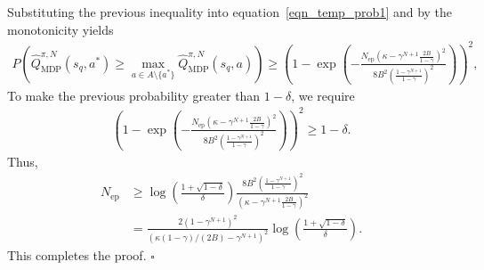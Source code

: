 \documentclass[10pt]{article}
\def\eqref#1{equation~\ref{#1}}
\newenvironment{myproof}{{\noindent\it Proof. }}{\hfill $\square$ \par}
\begin{document}
\begin{myproof}
Substituting the previous inequality into \eqref{eqn_temp_prob1} and by the monotonicity yields
\begin{align}
    P \left( \hat{Q}_\text{MDP}^{\pi, N}(s_q, a^*) \geq \max_{a \in A \setminus \{a^*\}} \hat{Q}_\text{MDP}^{\pi, N}(s_q, a) \right)
    \geq \left( 1 - \exp \left( - \frac{N_\text{ep}  \left(\kappa - \gamma^{N+1} \frac{2B}{1-\gamma} \right)^2}{8B^2 \left( \frac{1-\gamma^{N+1}}{1-\gamma}\right)^2} \right) \right)^2,
\end{align}
To make the previous probability greater than $1-\delta$, we require
\begin{align}
    \left( 1 - \exp \left( - \frac{N_\text{ep}  \left(\kappa - \gamma^{N+1} \frac{2B}{1-\gamma} \right)^2 }{8B^2 \left( \frac{1-\gamma^{N+1}}{1-\gamma}\right)^2} \right) \right)^2 \geq 1-\delta.
\end{align}
Thus,
\begin{align}
    N_\text{ep} &\geq \log \left( \frac{1+\sqrt{1-\delta}}{\delta} \right) \frac{8B^2 \left( \frac{1-\gamma^{N+1}}{1-\gamma}\right)^2}{\left(\kappa - \gamma^{N+1} \frac{2B}{1-\gamma} \right)^2} \\
    &= \frac{ 2 \left( 1-\gamma^{N+1}\right)^2}{ \left( \kappa \left( 1-\gamma \right) / (2B) - \gamma^{N+1}\right)^2} \log \left( \frac{1+\sqrt{1-\delta}}{\delta} \right).
\end{align}
This completes the proof.
\end{myproof}
\end{document}
